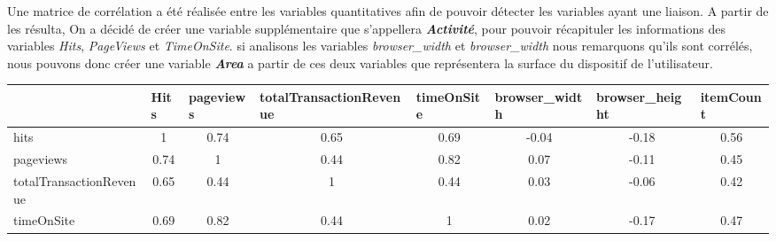 Une matrice de corrélation a été réalisée entre les variables quantitatives afin de pouvoir détecter les variables ayant une liaison. A partir de les résulta, On a décidé de créer une variable supplémentaire que s'appellera \emph{\textbf{Activité}}, pour pouvoir récapituler les informations des variables \emph{Hits}, \emph{PageViews} et \emph{TimeOnSite}.  si analisons les variables  \emph{browser\_width} et \emph{browser\_width} nous remarquons qu'ils sont corrélés, nous pouvons donc créer une variable  \emph{\textbf{Area}} a partir de ces deux variables que représentera la surface du dispositif de l'utilisateur.

\begin{table}[ht]
\begin{adjustbox}{width=1\textwidth}
\small
\begin{tabular}{|l|c|c|c|c|c|c|c|}
\hline
                        & \multicolumn{1}{l|}{Hits} & \multicolumn{1}{l|}{pageviews} & \multicolumn{1}{l|}{totalTransactionRevenue} & \multicolumn{1}{l|}{timeOnSite} & \multicolumn{1}{l|}{browser\_width} & \multicolumn{1}{l|}{browser\_height} & \multicolumn{1}{l|}{itemCount} \\ \hline
hits                    & 1                         & \cellcolor{green!15} 0.74                           & 0.65                                         & 0.69                            & -0.04                               & -0.18                                & 0.56                           \\ \hline
pageviews               & \cellcolor{green!15}0.74                      & 1                              & 0.44                                         & \cellcolor{green!15}0.82                            & 0.07                                & -0.11                                & 0.45                           \\ \hline
totalTransactionRevenue & 0.65                      & 0.44                           & 1                                            & 0.44                            & 0.03                                & -0.06                                & 0.42                           \\ \hline
timeOnSite              & 0.69                      &\cellcolor{green!15} 0.82                           & 0.44                                         & 1                               & 0.02                                & -0.17                                & 0.47                           \\ \hline

\end{tabular}
\end{adjustbox}
\end{table}
